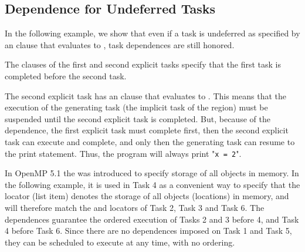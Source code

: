 

\subsection{Dependence for Undeferred Tasks}
\label{subsec:depend_undefer_task}

In the following example, we show that even if a task is undeferred as specified
by an  clause that evaluates to , task dependences are
still honored.

The  clauses of the first and second explicit tasks specify that
the first task is completed before the second task.

The second explicit task has an  clause that evaluates to .
This means that the execution of the generating task (the implicit task of
the  region) must be suspended until the second explicit task
is completed.
But, because of the dependence, the first explicit task must complete first,
then the second explicit task can execute and complete, and only then 
the generating task can resume to the print statement.
Thus, the program will always print "\texttt{x = 2}".

\clearpage



In OpenMP 5.1 the   was introduced
to specify storage of all objects in memory. In the following example,
it is used in Task 4 as a convenient way to specify that the locator
(list item) denotes the storage of all objects (locations) in memory, and 
will therefore match the  and  locators of Task 2, Task 3 and Task 6.
The dependences guarantee the ordered execution of Tasks 2 and 3 before 4, and
Task 4 before Task 6.
Since there are no dependences imposed on Task 1 and Task 5, they can be
scheduled to execute at any time, with no ordering.

